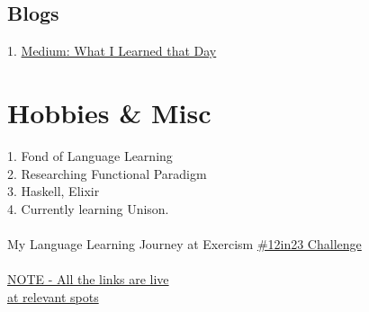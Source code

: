 \documentclass[]{deedy-resume-openfont}
\begin{document}
\begin{minipage}[t]{0.33\textwidth}
\subsection{Blogs}
1. \href{https://innovertz.medium.com/what-i-learned-that-day-bd1cd4f7c8d9}{Medium: What I Learned that Day}
\sectionsep

\section{Hobbies \& Misc}
1. Fond of Language Learning \\
2. Researching Functional Paradigm \\
3. Haskell, Elixir \\
4. Currently learning Unison. \\~\\
My Language Learning Journey at Exercism 
\href{https://exercism.org/profiles/HamzaMateen}{\#12in23 Challenge} \\~\\

\href{https://exercism.org/profiles/HamzaMateen}{NOTE - All the links are live \\ 
at relevant spots}
%
%

\end{minipage} 
\hfill
\end{document}
